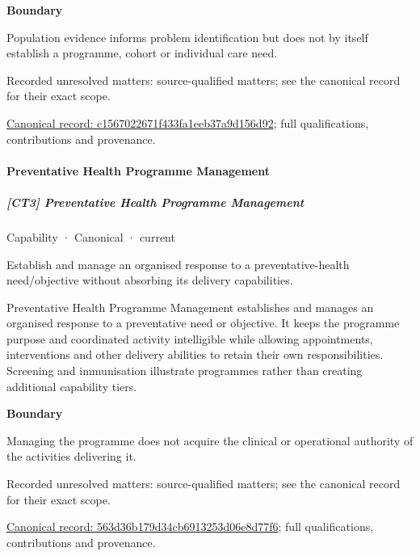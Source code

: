 \textbf{Boundary}



Population evidence informs problem identification but does not by itself establish a programme, cohort or individual care need.


{\small Recorded unresolved matters: source-qualified matters; see the canonical record for their exact scope.}\par
{\footnotesize \href{../../../../continuum/strategy/capability/c1567022671f433fa1eeb37a9d156d92.md}{Canonical record: c1567022671f433fa1eeb37a9d156d92}; full qualifications, contributions and provenance.}\par
\paragraph{Preventative Health Programme Management}

\subparagraph{[CT3] Preventative Health Programme Management}

\label{element:563d36b179d34cb6913253d06e8d77f6}
{\small Capability · Canonical · current}\par

Establish and manage an organised response to a preventative-health need/objective without absorbing its delivery capabilities.



Preventative Health Programme Management establishes and manages an organised response to a preventative need or objective. It keeps the programme purpose and coordinated activity intelligible while allowing appointments, interventions and other delivery abilities to retain their own responsibilities. Screening and immunisation illustrate programmes rather than creating additional capability tiers.



\textbf{Boundary}



Managing the programme does not acquire the clinical or operational authority of the activities delivering it.


{\small Recorded unresolved matters: source-qualified matters; see the canonical record for their exact scope.}\par
{\footnotesize \href{../../../../continuum/strategy/capability/563d36b179d34cb6913253d06e8d77f6.md}{Canonical record: 563d36b179d34cb6913253d06e8d77f6}; full qualifications, contributions and provenance.}\par
